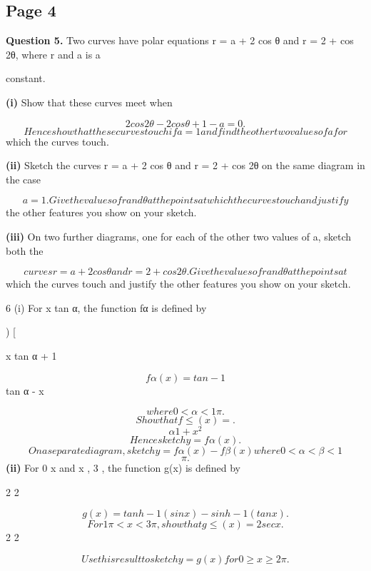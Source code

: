 \documentclass[12pt]{article}
\begin{document}
\subsection*{Page 4}
\begin{flushleft}
\bigskip\textbf{Question 5.} Two curves have polar equations r = a + 2 cos θ and r = 2 + cos 2θ, where r  and a is a\par
constant.\par
\textbf{(i)} Show that these curves meet when\par
\[2 cos 2 θ - 2 cos θ + 1 - a = 0 .\]
\[Hence show that these curves touch if a = 1 and find the other two values of a for\]
which the curves touch.\par
\textbf{(ii)} Sketch the curves r = a + 2 cos θ and r = 2 + cos 2θ on the same diagram in the case\par
\[a = 1 . Give the values of r and θ at the points at which the curves touch and justify\]
the other features you show on your sketch.\par
\textbf{(iii)} On two further diagrams, one for each of the other two values of a, sketch both the\par
\[curves r = a + 2 cos θ and r = 2 + cos 2θ. Give the values of r and θ at the points at\]
which the curves touch and justify the other features you show on your sketch.\par
6 (i) For x \ne tan α, the function fα is defined by\par
) [\par
x tan α + 1\par
\[fα(x) = tan -1\]
tan α - x\par
\[where 0 < α < 1 \pi.\]
\[Show that f \leq (x) = .\]
\[α 1 + x^2\]
\[Hence sketch y = fα(x).\]
\[On a separate diagram, sketch y = fα(x) - fβ(x) where 0 < α < β < 1\]
\[\pi.\]
\textbf{(ii)} For 0 \geq x \pi and x  \pi, 3 \pi, the function g(x) is defined by\par
2 2\par
\[g(x) = tanh -1 (sin x) - sinh -1 (tan x).\]
\[For 1 \pi < x < 3 \pi, show that g \leq (x) = 2 sec x.\]
2 2\par
\[Use this result to sketch y = g(x) for 0 \geq x \geq 2\pi.\]
\end{flushleft}
\end{document}
